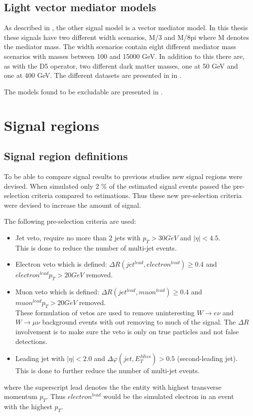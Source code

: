 \subsection{Light vector mediator models}\label{sec:signal:subsec:vecmed}
As described in , the other signal model is a vector mediator model. In this thesis these signals have two different width scenarios, M/3 and M/8pi where M denotes the mediator mass. The width scenarios contain eight different mediator mass scenarios with masses between 100 and 15000 GeV. In addition to this there are, as with the D5 operator, two different dark matter masses, one at 50 GeV and one at 400 GeV. The different datasets are presented in  in .

The models found to be excludable are presented in . 
\newpage
\section{Signal regions}
\subsection{Signal region definitions}\label{sec:sr:subsec:srd}
To be able to compare signal results to previous studies new signal regions were devised. When simulated only 2 \% of the estimated signal events passed the pre-selection criteria compared to estimations. Thus these new pre-selection criteria were devised to increase the amount of signal. 

The following pre-selection criteria are used:
\begin{itemize}
\item Jet veto, require no more than 2 jets with $p_T > 30 GeV$ and $|\eta| < 4.5$.  \\ 
This is done to reduce the number of multi-jet events.
\item Electron veto which is defined: $\Delta R (jet^{lead},electron^{lead})\geq 0.4$ and \\
$electron^{lead} p_T>20 GeV$ removed.
\item Muon veto which is defined: $\Delta R (jet^{lead},muon^{lead})\geq 0.4$ and \\
$muon^{lead} p_T>20 GeV$ removed. \\
These formulation of vetos are used to remove uninteresting $W \rightarrow e \nu$ and $W \rightarrow \mu \nu$ background events with out removing to much of the signal. The $\Delta R$ involvement is to make sure the veto is only on true particles and not false detections.
\item Leading jet with $|\eta| < 2.0$ and $\Delta \varphi (jet, E_T^{Miss})>0.5$ (second-leading jet).\\ 
This is done to further reduce the number of multi-jet events.
\end{itemize}
where the superscript lead denotes the the entity with highest transverse momentum $p_T$. Thus $electron^{lead}$ would be the simulated electron in an event with the highest $p_T$.

